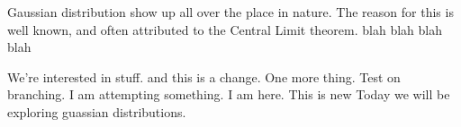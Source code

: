 Gaussian distribution show up all over the place in nature.
The reason for this is well known,
and often attributed to the Central Limit theorem. blah blah blah blah
\cite{clt} \cite{clt2}

We're interested in stuff. and this is a change. One more thing. Test on
branching. I am attempting something. I am here. This is new
Today we will be exploring guassian distributions.
